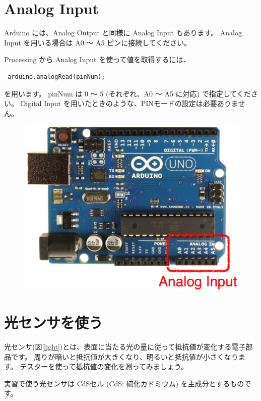 \documentclass[11pt,a4paper]{jarticle}
\begin{document}
\section{Analog Input}
Arduino には、Analog Output と同様に Analog Input もあります。
Analog Input を用いる場合は A0 〜 A5 ピンに接続してください。

Processing から Analog Input を使って値を取得するには、
\begin{lstlisting}
 arduino.analogRead(pinNum);
\end{lstlisting}
を用います。
pinNum は 0 〜 5 (それぞれ、A0 〜 A5 に対応) で指定してください。
Digital Input を用いたときのような、PINモードの設定は必要ありません。

\begin{figure}[h!]
 \centering
 \includegraphics[width=0.4\columnwidth]{img/analog_input_pins.eps}
\end{figure}

\section{光センサを使う}
光センサ(図\ref{light})とは、表面に当たる光の量に従って抵抗値が変化する電子部品です。
周りが暗いと抵抗値が大きくなり、明るいと抵抗値が小さくなります。
テスターを使って抵抗値の変化を測ってみましょう。

実習で使う光センサは CdSセル (CdS: 硫化カドミウム) を主成分とするものです。
\end{document}
